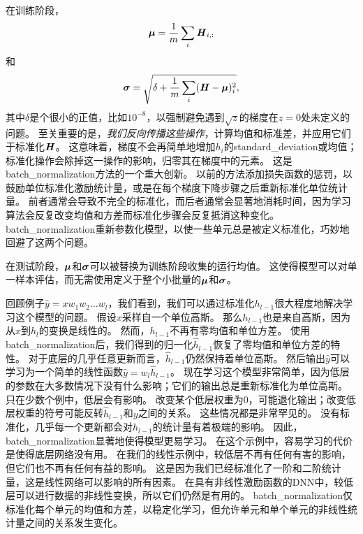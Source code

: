 在训练阶段，
\begin{equation}
    \boldsymbol{\mu} = \frac{1}{m} \sum_i \boldsymbol{\mathit{H}}_{i,:}
\end{equation}
和
\begin{equation}
    \boldsymbol{\sigma} = \sqrt{ \delta + \frac{1}{m} \sum_i (\boldsymbol{\mathit{H}} - \boldsymbol{\mu})_i^2 },
\end{equation}
其中$\delta$是个很小的正值，比如$10^{-8}$，以强制避免遇到$\sqrt{z}$的梯度在$z=0$处未定义的问题。
至关重要的是，\emph{我们反向传播这些操作}，计算均值和标准差，并应用它们于标准化$\boldsymbol{\mathit{H}}$。
这意味着，梯度不会再简单地增加$h_i$的\gls{standard_deviation}或均值；标准化操作会除掉这一操作的影响，归零其在梯度中的元素。
这是\gls{batch_normalization}方法的一个重大创新。
以前的方法添加损失函数的惩罚，以鼓励单位标准化激励统计量，或是在每个梯度下降步骤之后重新标准化单位统计量。
前者通常会导致不完全的标准化，而后者通常会显著地消耗时间，因为学习算法会反复改变均值和方差而标准化步骤会反复抵消这种变化。
\gls{batch_normalization}重新参数化模型，以使一些单元总是被定义标准化，巧妙地回避了这两个问题。


在测试阶段，$\boldsymbol{\mu}$和$\boldsymbol{\sigma}$可以被替换为训练阶段收集的运行均值。
这使得模型可以对单一样本评估，而无需使用定义于整个小批量的$\boldsymbol{\mu}$和$\boldsymbol{\sigma}$。

回顾例子$\hat{y} = x w_1 w_2 \dots w_l$，我们看到，我们可以通过标准化$h_{l-1}$很大程度地解决学习这个模型的问题。
假设$x$采样自一个单位高斯。
那么$h_{l-1}$也是来自高斯，因为从$x$到$h_l$的变换是线性的。
然而，$h_{l-1}$不再有零均值和单位方差。
使用\gls{batch_normalization}后，我们得到的归一化$\hat{h}_{l-1}$恢复了零均值和单位方差的特性。
对于底层的几乎任意更新而言，$\hat{h}_{l-1}$仍然保持着单位高斯。
然后输出$\hat{y}$可以学习为一个简单的线性函数$\hat{y} = w_l \hat{h}_{l-1}$。
现在学习这个模型非常简单，因为低层的参数在大多数情况下没有什么影响；它们的输出总是重新标准化为单位高斯。
只在少数个例中，低层会有影响。
改变某个低层权重为$0$，可能退化输出；改变低层权重的符号可能反转$\hat{h}_{l-1}$和$y$之间的关系。
这些情况都是非常罕见的。
没有标准化，几乎每一个更新都会对$h_{l-1}$的统计量有着极端的影响。
因此，\gls{batch_normalization}显著地使得模型更易学习。
在这个示例中，容易学习的代价是使得底层网络没有用。
在我们的线性示例中，较低层不再有任何有害的影响，但它们也不再有任何有益的影响。
这是因为我们已经标准化了一阶和二阶统计量，这是线性网络可以影响的所有因素。
在具有非线性激励函数的\gls{DNN}中，较低层可以进行数据的非线性变换，所以它们仍然是有用的。
\gls{batch_normalization}仅标准化每个单元的均值和方差，以稳定化学习，但允许单元和单个单元的非线性统计量之间的关系发生变化。

